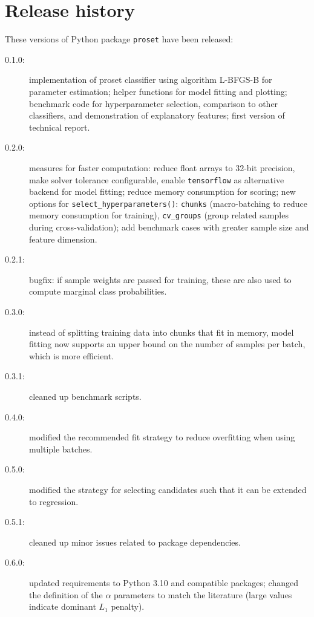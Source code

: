 \section{Release history}
\label{sec_release_history}
%
These versions of Python package \texttt{proset} have been released:
%
\begin{description}
\item[0.1.0:] implementation of proset classifier using algorithm L-BFGS-B \cite{Byrd_95} for parameter estimation;
helper functions for model fitting and plotting;
benchmark code for hyperparameter selection, comparison to other classifiers, and demonstration of explanatory features;
first version of technical report.
%
\item[0.2.0:] measures for faster computation: reduce float arrays to 32-bit precision, make solver tolerance configurable,
enable \texttt{tensorflow} \cite{Abadi_15} as alternative backend for model fitting;
reduce memory consumption for scoring;
new options for \texttt{select\_hyperparameters()}: \texttt{chunks} (macro-batching to reduce memory consumption for training), \texttt{cv\_groups} (group related samples during cross-validation);
add benchmark cases with greater sample size and feature dimension.
%
\item[0.2.1:] bugfix: if sample weights are passed for training, these are also used to compute marginal class probabilities.
%
\item[0.3.0:] instead of splitting training data into chunks that fit in memory, model fitting now supports an upper bound
on the number of samples per batch, which is more efficient.
%
\item[0.3.1:] cleaned up benchmark scripts.
%
\item[0.4.0:] modified the recommended fit strategy to reduce overfitting when using multiple batches.
%
\item[0.5.0:] modified the strategy for selecting candidates such that it can be extended to regression.
%
\item[0.5.1:] cleaned up minor issues related to package dependencies.
%
\item[0.6.0:] updated requirements to Python 3.10 and compatible packages;
changed the definition of the $\alpha$ parameters to match the literature (large values indicate dominant $L_1$ penalty).
\end{description}
%
\endinput
